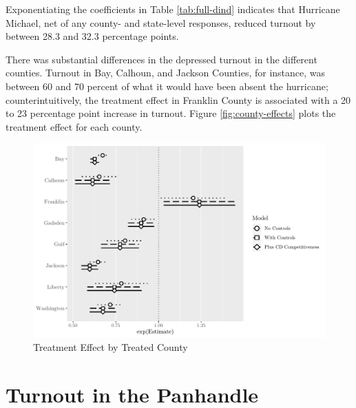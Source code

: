 \documentclass[
  12pt,
]{article}
\begin{document}
\begin{singlespace}


\end{singlespace}

Exponentiating the coefficients in Table \ref{tab:full-dind} indicates that Hurricane Michael, net of any county- and state-level responses, reduced turnout by between 28.3 and 32.3 percentage points.

There was substantial differences in the depressed turnout in the different counties. Turnout in Bay, Calhoun, and Jackson Counties, for instance, was between 60 and 70 percent of what it would have been absent the hurricane; counterintuitively, the treatment effect in Franklin County is associated with a 20 to 23 percentage point increase in turnout. Figure \ref{fig:county-effects} plots the treatment effect for each county.

\begin{figure}[H]

{\centering \includegraphics{hurricane_michael_files/figure-latex/county-effect-chunk-1} 

}

\caption{\label{fig:county-effects}Treatment Effect by Treated County}\label{fig:county-effect-chunk}
\end{figure}

\hypertarget{turnout-in-the-panhandle}{%
\section*{Turnout in the Panhandle}\label{turnout-in-the-panhandle}}
\end{document}
